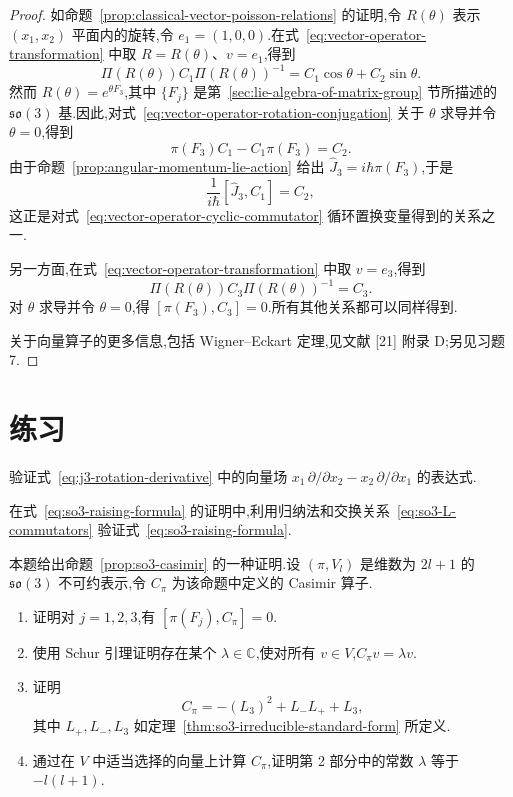 \begin{proof}
如命题~\ref{prop:classical-vector-poisson-relations} 的证明,令 $R(\theta)$ 表示 $(x_1,x_2)$ 平面内的旋转,令 $e_1=(1,0,0)$.在式~\eqref{eq:vector-operator-transformation} 中取 $R=R(\theta)$、$v=e_1$,得到
\[
 \Pi(R(\theta))C_1\Pi(R(\theta))^{-1}=C_1\cos\theta+C_2\sin\theta.
\label{eq:vector-operator-rotation-conjugation}
\]
然而 $R(\theta)=e^{\theta F_3}$,其中 $\{F_j\}$ 是第~\ref{sec:lie-algebra-of-matrix-group} 节所描述的 $\mathfrak{so}(3)$ 基.因此,对式~\eqref{eq:vector-operator-rotation-conjugation} 关于 $\theta$ 求导并令 $\theta=0$,得到
\[
 \pi(F_3)C_1-C_1\pi(F_3)=C_2.
\]
由于命题~\ref{prop:angular-momentum-lie-action} 给出 $\widehat J_3=i\hbar\pi(F_3)$,于是
\[
 \frac1{i\hbar}[\widehat J_3,C_1]=C_2,
\]
这正是对式~\eqref{eq:vector-operator-cyclic-commutator} 循环置换变量得到的关系之一.

另一方面,在式~\eqref{eq:vector-operator-transformation} 中取 $v=e_3$,得到
\[
 \Pi(R(\theta))C_3\Pi(R(\theta))^{-1}=C_3.
\]
对 $\theta$ 求导并令 $\theta=0$,得 $[\pi(F_3),C_3]=0$.所有其他关系都可以同样得到.

关于向量算子的更多信息,包括 Wigner--Eckart 定理,见文献 [21] 附录 D;另见习题 7.
\end{proof}

\section{练习}
\label{sec:chapter17-exercises}

\begin{exercise}[验证旋转向量场]\label{ex:rotation-vector-field}
验证式~\eqref{eq:j3-rotation-derivative} 中的向量场 $x_1\,\partial/\partial x_2-x_2\,\partial/\partial x_1$ 的表达式.
\end{exercise}

\begin{exercise}[验证升算子公式]\label{ex:so3-raising-induction}
在式~\eqref{eq:so3-raising-formula} 的证明中,利用归纳法和交换关系~\eqref{eq:so3-L-commutators} 验证式~\eqref{eq:so3-raising-formula}.
\end{exercise}

\begin{exercise}\label{ex:so3-casimir}
本题给出命题~\ref{prop:so3-casimir} 的一种证明.设 $(\pi,V_l)$ 是维数为 $2l+1$ 的 $\mathfrak{so}(3)$ 不可约表示,令 $C_\pi$ 为该命题中定义的 Casimir 算子.
\begin{enumerate}
\item 证明对 $j=1,2,3$,有 $[\pi(F_j),C_\pi]=0$.
\item 使用 Schur 引理证明存在某个 $\lambda\in\mathbb C$,使对所有 $v\in V$,$C_\pi v=\lambda v$.
\item 证明
\[
 C_\pi=-(L_3)^2+L_-L_++L_3,
\]
其中 $L_+,L_-,L_3$ 如定理~\ref{thm:so3-irreducible-standard-form} 所定义.
\item 通过在 $V$ 中适当选择的向量上计算 $C_\pi$,证明第 2 部分中的常数 $\lambda$ 等于 $-l(l+1)$.
\end{enumerate}
\end{exercise}

